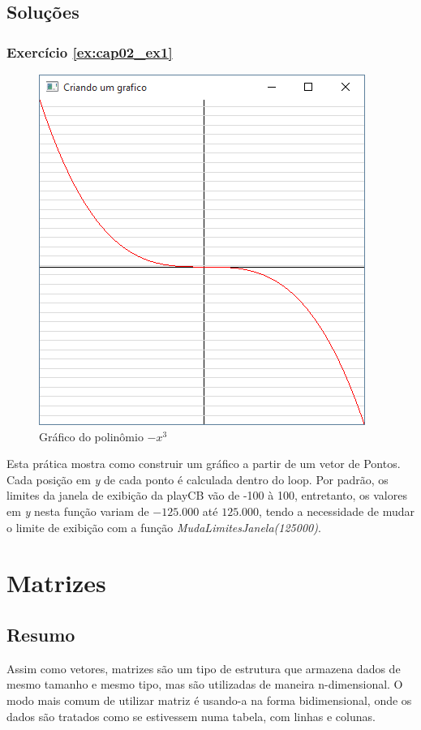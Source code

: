 \section*{Soluções}

\subsection*{Exercício \ref{ex:cap02_ex1}}
\begin{figure}[ht]
  \centerline{\includegraphics[width=.5\textwidth]{img/cap2_ex8.png}}
  \caption{Gráfico do polinômio $-x^3$}
  \label{fig:cap02_ex1}
\end{figure}
Esta prática mostra como construir um gráfico a partir de um vetor de Pontos. Cada posição em \emph{y} de cada ponto é calculada dentro do loop. Por padrão, os limites da janela de exibição da playCB vão de -100 à 100, entretanto, os valores em \emph{y} nesta função variam de $-125.000$ até $125.000$, tendo a necessidade de mudar o limite de exibição com a função \emph{MudaLimitesJanela(125000)}.


\chapter[Matrizes]
{Matrizes}



\section*{Resumo}

Assim como vetores, matrizes são um tipo de estrutura que armazena dados de mesmo tamanho e mesmo tipo, mas são utilizadas de maneira n-dimensional. O modo mais comum de utilizar matriz é usando-a na forma bidimensional, onde os dados são tratados como se estivessem numa tabela, com linhas e colunas.


